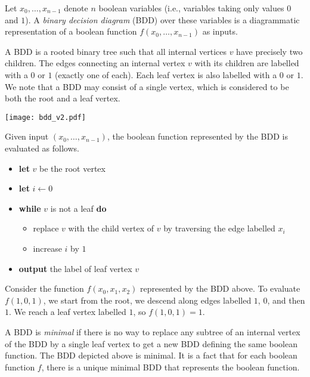 
Let $x_0, \ldots, x_{n-1}$ denote $n$ boolean variables (i.e., variables
taking only values $0$ and $1$). A {\em binary decision diagram} (BDD)
over these variables is a diagrammatic representation of a boolean
function $f(x_0, \ldots, x_{n-1})$ as inputs.

A BDD is a rooted binary tree such that all internal vertices $v$ have
precisely two children. The edges connecting an internal vertex $v$ with
its children are labelled with a $0$ or $1$ (exactly one of each). Each
leaf vertex is also labelled with a $0$ or $1$.  We note that a BDD may
consist of a single vertex, which is considered to be both the root and a
leaf vertex.


\begin{center}
\texttt{[image: bdd\_v2.pdf]}
\end{center}

Given input $(x_0, \ldots, x_{n-1})$, the boolean function represented by
the BDD is evaluated as follows.
\begin{itemize}
    \item {\bf let} $v$ be the root vertex
    \item {\bf let} $i \leftarrow 0$
    \item {\bf while} $v$ is not a leaf {\bf do}
    \begin{itemize}
        \item replace $v$ with the child vertex of $v$ by traversing the edge labelled $x_i$
        \item increase $i$ by $1$
    \end{itemize}
    \item {\bf output} the label of leaf vertex $v$
\end{itemize}
Consider the function $f(x_0,x_1,x_2)$ represented by the BDD above. To
evaluate $f(1,0,1)$, we start from the root, we descend along edges
labelled $1$, $0$, and then $1$. We reach a leaf vertex
labelled $1$, so $f(1,0,1) = 1$.

A BDD is {\em minimal} if there is no way to replace any subtree of an
internal vertex of the BDD by a single leaf vertex
to get a new BDD defining the same boolean function.
The BDD depicted above is minimal.  It is a fact that for each boolean
function $f$, there is a unique minimal BDD that represents
the boolean function.

